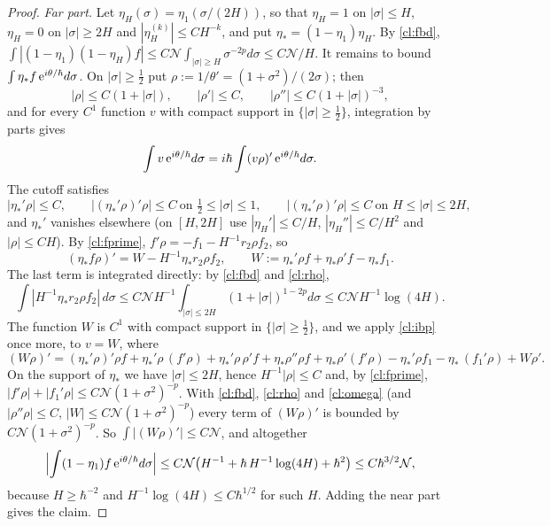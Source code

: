 \begin{proof}
\emph{Far part.} Let $\eta_H(\sigma)=\eta_1(\sigma/(2H))$, so that $\eta_H=1$ on $|\sigma|\le H$, $\eta_H=0$ on $|\sigma|\ge2H$ and
$|\eta_H^{(k)}|\le CH^{-k}$, and put $\eta_*=(1-\eta_1)\eta_H$. By \eqref{cl:fbd}, $\int|(1-\eta_1)(1-\eta_H)f|\le C\mathcal N\int_{|\sigma|\ge H}\sigma^{-2p}d\sigma\le C\mathcal N/H$.
It remains to bound $\int\eta_* f\,\mathrm{e}^{i\theta/\hbar}d\sigma$. On $|\sigma|\ge\tfrac12$ put $\rho:=1/\theta'=(1+\sigma^2)/(2\sigma)$; then
\begin{equation}\label{cl:rho}
|\rho|\le C(1+|\sigma|),\qquad|\rho'|\le C,\qquad|\rho''|\le C(1+|\sigma|)^{-3},
\end{equation}
and for every $C^1$ function $v$ with compact support in $\{|\sigma|\ge\tfrac12\}$, integration by parts gives
\begin{equation}\label{cl:ibp}
\int v\,\mathrm{e}^{i\theta/\hbar}d\sigma=i\hbar\int(v\rho)'\,\mathrm{e}^{i\theta/\hbar}d\sigma .
\end{equation}
The cutoff satisfies
\begin{equation}\label{cl:omega}
|\eta_*'\rho|\le C,\qquad|(\eta_*'\rho)'\rho|\le C\ \text{on }\tfrac12\le|\sigma|\le1,\qquad|(\eta_*'\rho)'\rho|\le C\ \text{on }H\le|\sigma|\le2H,
\end{equation}
and $\eta_*'$ vanishes elsewhere (on $[H,2H]$ use $|\eta_H'|\le C/H$, $|\eta_H''|\le C/H^2$ and $|\rho|\le CH$). By \eqref{cl:fprime},
$f'\rho=-f_1-H^{-1}r_2\rho f_2$, so
\[
(\eta_* f\rho)'=W-H^{-1}\eta_* r_2\rho f_2,\qquad W:=\eta_*'\rho f+\eta_*\rho'f-\eta_* f_1 .
\]
The last term is integrated directly: by \eqref{cl:fbd} and \eqref{cl:rho},
\[
\int|H^{-1}\eta_* r_2\rho f_2|\,d\sigma\le C\mathcal N H^{-1}\int_{|\sigma|\le2H}(1+|\sigma|)^{1-2p}d\sigma\le C\mathcal N H^{-1}\log(4H).
\]
The function $W$ is $C^1$ with compact support in $\{|\sigma|\ge\tfrac12\}$, and we apply \eqref{cl:ibp} once more, to $v=W$, where
\[
(W\rho)'=(\eta_*'\rho)'\rho f+\eta_*'\rho\,(f'\rho)+\eta_*'\rho\,\rho'f+\eta_*\rho''\rho f+\eta_*\rho'(f'\rho)-\eta_*'\rho f_1-\eta_*\,(f_1'\rho)+W\rho' .
\]
On the support of $\eta_*$ we have $|\sigma|\le2H$, hence $H^{-1}|\rho|\le C$ and, by \eqref{cl:fprime},
$|f'\rho|+|f_1'\rho|\le C\mathcal N(1+\sigma^2)^{-p}$. With \eqref{cl:fbd}, \eqref{cl:rho} and \eqref{cl:omega} (and $|\rho''\rho|\le C$, $|W|\le C\mathcal N(1+\sigma^2)^{-p}$) every term of $(W\rho)'$ is
bounded by $C\mathcal N(1+\sigma^2)^{-p}$. So $\int|(W\rho)'|\le C\mathcal N$, and altogether
\[
\Bigl|\int(1-\eta_1)f\,\mathrm{e}^{i\theta/\hbar}d\sigma\Bigr|\le C\mathcal N\bigl(H^{-1}+\hbar\,H^{-1}\log(4H)+\hbar^2\bigr)\le C\hbar^{3/2}\mathcal N,
\]
because $H\ge\hbar^{-2}$ and $H^{-1}\log(4H)\le C\hbar^{1/2}$ for such $H$. Adding the near part gives the claim.
\end{proof}

